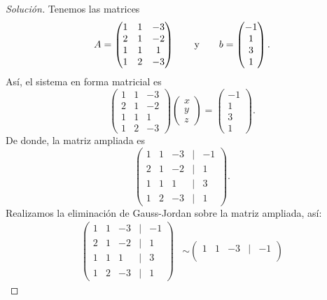 \documentclass[a4,11pt]{aleph-notas}
\begin{document}
\begin{proof}[Solución]\hspace{0pt}
    Tenemos las matrices
    \[
        A = \begin{pmatrix}
            1&1&-3\\2&1&-2\\1&1&1\\1&2&-3
        \end{pmatrix}
        \qquad\text{y}\qquad
        b = \begin{pmatrix}
             -1 \\ 1\\ 3 \\ 1
        \end{pmatrix}.
    \]
    Así, el sistema en forma matricial es
    \[
        \begin{pmatrix}
            1&1&-3\\2&1&-2\\1&1&1\\1&2&-3
        \end{pmatrix}
        \begin{pmatrix}
            x \\ y\\ z
        \end{pmatrix}
        =
        \begin{pmatrix}
            -1 \\ 1\\ 3 \\ 1
        \end{pmatrix}.
    \]
    De donde, la matriz ampliada es
    \[
        \begin{pmatrix}
            1&1&-3&|&-1\\
            2&1&-2&|&1\\
            1&1&1&|&3\\
            1&2&-3&|&1
         \end{pmatrix}.
    \]
    Realizamos la eliminación de Gauss-Jordan sobre la matriz ampliada, así:
    \begin{align*}
        \begin{pmatrix}
            1&1&-3&|&-1\\
            2&1&-2&|&1\\
            1&1&1&|&3\\
            1&2&-3&|&1
        \end{pmatrix}
        & \sim 
        \begin{pmatrix}
            1&1&-3&|&-1\\

\end{pmatrix}
\end{align*}
\end{proof}
\end{document}

